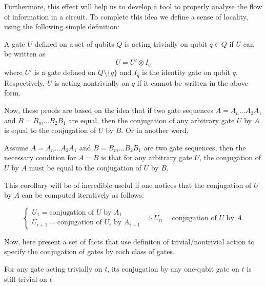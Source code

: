 Furthermore, this effect will help us to develop a tool to properly analyse the flow of information in a circuit. To complete this idea we define a sense of locality, using the following simple definition:

\begin{definition}
  A gate $U$ defined on a set of qubits $Q$ is acting trivially on qubit $q \in Q$ if $U$ can be written as 
  \begin{equation}
    U = U' \otimes I_q
  \end{equation}
  where $U'$ is a gate defined on $Q \setminus \{ q \}$ and $I_q$ is the identity gate on qubit $q$.
  Respectively, $U$ is acting nontrivially on $q$ if it cannot be written in the above form.
\end{definition}

Now, these proofs are based on the idea that if two gate sequences $A = A_n \dots A_2 A_1$ and $B = B_m \dots B_2 B_1$ are equal, then the conjugation of any arbitrary gate $U$ by $A$ is equal to the conjugation of $U$ by $B$. Or in another word,

\begin{corollary}
  Assume $A = A_n \dots A_2 A_1$ and $B = B_m \dots B_2 B_1$ are two gate sequences, then the necessary condition for $A = B$ is that for any arbitrary gate $U$, the conjugation of $U$ by $A$ must be equal to the conjugation of $U$ by $B$.
\end{corollary}

This corollary will be of incredible useful if one notices that the conjugation of $U$ by $A$ can be computed iteratively as follows:

\begin{equation}
  \begin{cases}
    U_1 = \text{conjugation of } U \text{ by } A_1 \\
    U_{i+1} = \text{conjugation of } U_i \text{ by } A_{i+1}
  \end{cases}
  \Rightarrow U_n = \text{conjugation of } U \text{ by } A.
\end{equation}

Now, here present a set of facts that use definiton of trivial/nontrivial action to specify the conjugation of gates by each class of gates.

\begin{corollary}\label{cor:no-go-one-qubit}
  For any gate acting trivially on $t$, its conjugation by any one-qubit gate on $t$ is still trivial on $t$. 
\end{corollary}

